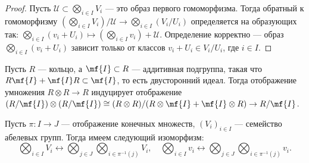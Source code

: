 \documentclass[
	extrafontsizes,
	11pt,
	hyphens,
]{memoir}
\begin{document}
\begin{proof}
Пусть \(\mathcal{U} \subset \bigotimes_{i \in I} V_i\) --- это образ первого гомоморфизма.
Тогда обратный к гомоморфизму
\((\bigotimes_{i \in I} V_i) / \mathcal{U} \to \bigotimes_{i \in I} (V_i / U_i)\)
определяется на образующих так:
\(
\bigotimes_{i \in I} (v_i + U_i)
\mapsto
(\bigotimes_{i \in I} v_i) + \mathcal{U}
\).
Определение корректно --- образ
\(\bigotimes_{i \in I} (v_i + U_i)\) зависит только от классов \(v_i + U_i \in V_i/U_i\), где \(i \in I\).
\end{proof}

\begin{example}
Пусть \(R\) --- кольцо, а \(\mf{I} \subset R\) --- аддитивная подгруппа, такая что \(R\mf{I} + \mf{I}R \subset \mf{I}\), то есть двусторонний идеал. Тогда отображение умножения \(R \otimes R \to R\) индуцирует отображение \((R/\mf{I}) \otimes (R/\mf{I}) \cong (R \otimes R) / (R \otimes \mf{I} + \mf{I} \otimes R) \to R/\mf{I}\).
\end{example}

%

\begin{statement}
Пусть \(\pi : I \to J\) --- отображение конечных множеств, \((V_i)_{i \in I}\) --- семейство абелевых групп.
\label{sta:TensorAbAss}
Тогда имеем следующий изоморфизм:
\begin{equation}\label{eq:TensorAssIso}
\textstyle
\bigotimes_{i \in I} V_i
\leftrightarrow
\bigotimes_{j \in J}
	\bigotimes_{i \in \pi^{-1}(j)} V_i,
\quad
\bigotimes_{i \in I} v_i
\leftrightarrow
\bigotimes_{j \in J}
	\bigotimes_{i \in \pi^{-1}(j)} v_i.
\end{equation}
\end{statement}
\end{document}
